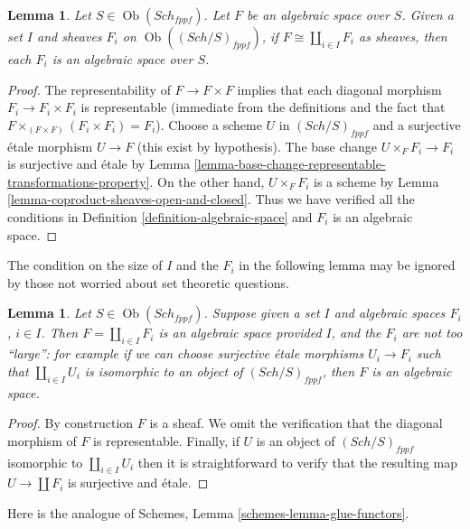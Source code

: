 \documentclass{stacks-project}
\theoremstyle{plain}
\newtheorem{lemma}[subsection]{Lemma}
\theoremstyle{definition}
\theoremstyle{remark}
\numberwithin{equation}{subsection}
\def\Sch{\mathit{Sch}}
\def\Ob{\mathop{\mathrm{Ob}}\nolimits}
\begin{document}
\begin{lemma}
\label{lemma-algebraic-space-coproduct-sheaves}
Let $S \in \Ob(\Sch_{fppf})$.
Let $F$ be an algebraic space over $S$.
Given a set $I$ and sheaves $F_i$ on
$\Ob((\Sch/S)_{fppf})$,
if $F \cong \coprod_{i\in I} F_i$ as sheaves,
then each $F_i$ is an algebraic space over $S$.
\end{lemma}

\begin{proof}
The representability of $F \to F \times F$ implies that each diagonal morphism
$F_i \to F_i \times F_i$ is representable (immediate from the definitions
and the fact that $F \times_{(F \times F)} (F_i \times F_i) = F_i$).
Choose a scheme $U$ in $(\Sch/S)_{fppf}$ and a surjective
\'etale morphism $U \to F$ (this exist by hypothesis).
The base change $U \times_F F_i \to F_i$ is surjective and \'etale
by Lemma \ref{lemma-base-change-representable-transformations-property}.
On the other hand, $U \times_F F_i$ is a scheme by
Lemma \ref{lemma-coproduct-sheaves-open-and-closed}.
Thus we have verified all the conditions in
Definition \ref{definition-algebraic-space}
and $F_i$ is an algebraic space.
\end{proof}

\noindent
The condition on the size of $I$ and the $F_i$ in the
following lemma may be ignored by those not worried about
set theoretic questions.

\begin{lemma}
\label{lemma-coproduct-algebraic-spaces}
Let $S \in \Ob(\Sch_{fppf})$.
Suppose given a set $I$ and algebraic spaces $F_i$, $i \in I$.
Then $F = \coprod_{i \in I} F_i$ is an algebraic space
provided $I$, and the $F_i$ are not too ``large'': for example if we
can choose surjective \'etale morphisms $U_i \to F_i$ such that
$\coprod_{i \in I} U_i$ is isomorphic to an object of
$(\Sch/S)_{fppf}$, then $F$ is an algebraic space.
\end{lemma}

\begin{proof}
By construction $F$ is a sheaf. We omit the verification that the
diagonal morphism of $F$ is representable. Finally, if $U$ is an
object of $(\Sch/S)_{fppf}$ isomorphic to $\coprod_{i \in I} U_i$
then it is straightforward to verify that the resulting map
$U \to \coprod F_i$ is surjective and \'etale.
\end{proof}

\noindent
Here is the analogue of Schemes, Lemma \ref{schemes-lemma-glue-functors}.
\end{document}
